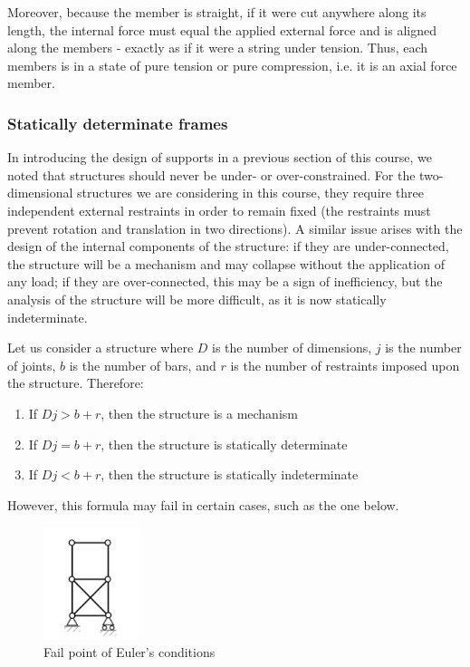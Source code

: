 \documentclass{article}
\begin{document}
Moreover, because the member is straight, if it were cut anywhere along its length, the internal force must equal the applied external force and is aligned along the members - exactly as if it were a string under tension. Thus, each members is in a state of pure tension or pure compression, i.e. it is an axial force member.

\subsubsection{Statically determinate frames}

In introducing the design of supports in a previous section of this course, we noted that structures should never be under- or over-constrained. For the two-dimensional structures we are considering in this course, they require three independent external restraints in order to remain fixed (the restraints must prevent rotation and translation in two directions). A similar issue arises with the design of the internal components of the structure: if they are under-connected, the structure will be a mechanism and may collapse without the application of any load; if they are over-connected, this may be a sign of inefficiency, but the analysis of the structure will be more difficult, as it is now statically indeterminate.

\begin{proposition}
    Let us consider a structure where $D$ is the number of dimensions, $j$ is the number of joints, $b$ is the number of bars, and $r$ is the number of restraints imposed upon the structure. Therefore:

    \begin{enumerate}
        \item If $Dj > b + r$, then the structure is a mechanism
        \item If $Dj = b + r$, then the structure is statically determinate
        \item If $Dj < b + r$, then the structure is statically indeterminate
    \end{enumerate}
\end{proposition}

However, this formula may fail in certain cases, such as the one below.

\begin{figure}[h]
    \centering
    \includegraphics[width = 0.25\textwidth]{images/indet.png}
    \caption{Fail point of Euler's conditions}
    \label{fig:enter-label}
\end{figure}
\end{document}
